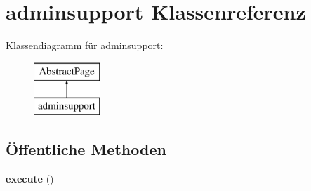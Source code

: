 \hypertarget{classadminsupport}{}\section{adminsupport Klassenreferenz}
\label{classadminsupport}
Klassendiagramm für adminsupport\+:\begin{figure}[H]
\begin{center}
\leavevmode
\includegraphics[height=2.000000cm]{classadminsupport}
\end{center}
\end{figure}
\subsection*{Öffentliche Methoden}
\begin{DoxyCompactItemize}
\item 
\mbox{\label{classadminsupport_a69becd0fcaea47ab0037a7139b6510ec}} 
{\bfseries execute} ()
\end{DoxyCompactItemize}

